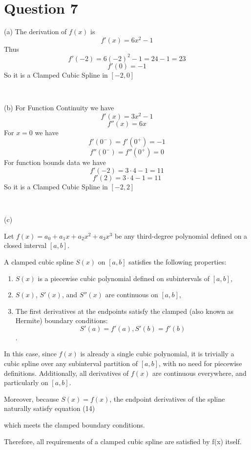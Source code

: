 \documentclass{article}
\begin{document}
{{\section*{Question 7}

(a) The derivation of $f (x)$ is
\[ f' (x) = 6 x^2 - 1 \]
Thus
\[ f'  (- 2) = 6 (- 2)^2 - 1 = 24 - 1 = 23 \]
\[ f' (0) = - 1 \]
So it is a Clamped Cubic Spline in $[- 2, 0]$

\

(b) For Function Continuity we have
\[ f' (x) = 3 x^2 - 1 \]
\[ f'' (x) = 6 x \]
For $x = 0$ we have
\[ f' (0^-) = f' (0^+) = - 1 \]
\[ f'' (0^-) = f'' (0^+) = 0 \]
For function bounds data we have
\[ f'  (- 2) = 3 \cdot 4 - 1 = 11 \]
\[ f' (2) = 3 \cdot 4 - 1 = 11 \]
So it is a Clamped Cubic Spline in $[- 2, 2]$

\

(c)

Let $f (x) = a_0 + a_1 x + a_2 x^2 + a_3 x^3$ be any third-degree polynomial
defined on a closed interval $[a, b]$.

A clamped cubic spline $S (x)$ on $[a, b]$ satisfies the following
properties:
\begin{enumerate}
  \item $S (x)$ is a piecewise cubic polynomial defined on subintervals of
  $[a, b]$,
  
  \item $S (x)$, $S' (x)$, and $S'' (x)$ are continuous on $[a, b]$,
  
  \item The first derivatives at the endpoints satisfy the clamped (also known
  as Hermite) boundary conditions:
  \begin{equation}
    S' (a) = f' (a), S' (b) = f' (b)
  \end{equation}
  .
\end{enumerate}
In this case, since $f (x)$ is already a single cubic polynomial, it is
trivially a cubic spline over any subinterval partition of $[a, b]$, with no
need for piecewise definitions. Additionally, all derivatives of $f (x)$ are
continuous everywhere, and particularly on $[a, b]$.

Moreover, because $S (x) = f (x)$, the endpoint derivatives of the spline
naturally satisfy equation (14)

which meets the clamped boundary conditions.

Therefore, all requirements of a clamped cubic spline are satisfied by f(x)
itself.

\

}}
\end{document}
